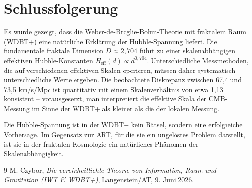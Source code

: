 \documentclass[11pt]{article}
\begin{document}
\section{Schlussfolgerung}

Es wurde gezeigt, dass die Weber-de-Broglie-Bohm-Theorie mit fraktalem Raum (WDBT+) eine natürliche Erklärung der Hubble-Spannung liefert. Die fundamentale fraktale Dimension \( D \approx 2,704 \) führt zu einer skalenabhängigen effektiven Hubble-Konstanten \( H_{\text{eff}}(d) \propto d^{0,704} \). Unterschiedliche Messmethoden, die auf verschiedenen effektiven Skalen operieren, müssen daher systematisch unterschiedliche Werte ergeben. Die beobachtete Diskrepanz zwischen 67,4 und 73,5 km/s/Mpc ist quantitativ mit einem Skalenverhältnis von etwa 1,13 konsistent – vorausgesetzt, man interpretiert die effektive Skala der CMB-Messung im Sinne der WDBT+ als kleiner als die der lokalen Messung.

Die Hubble-Spannung ist in der WDBT+ kein Rätsel, sondern eine erfolgreiche Vorhersage. Im Gegensatz zur ART, für die sie ein ungelöstes Problem darstellt, ist sie in der fraktalen Kosmologie ein natürliches Phänomen der Skalenabhängigkeit.

\begin{thebibliography}{9}
 M. Czybor, \textit{Die vereinheitlichte Theorie von Information, Raum und Gravitation (IWT \& WDBT+)}, Langenstein/AT, 9. Juni 2026.
\end{thebibliography}
\end{document}
